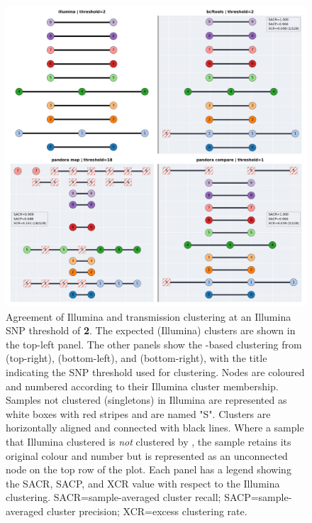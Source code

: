 \begin{figure}
\begin{center}
\includegraphics[width=0.90\columnwidth]{Chapter2/Figs/clustering-t2.png}
\caption{{Agreement of Illumina and \ont{} transmission clustering at an Illumina SNP threshold of \textbf{2}. The expected (Illumina) clusters are shown in the top-left panel. The other panels show the \ont{}-based clustering from \bcftools{} (top-right), \map{} (bottom-left), and \compare{} (bottom-right), with the title indicating the SNP threshold used for clustering. Nodes are coloured and numbered according to their Illumina cluster membership. Samples not clustered (singletons) in Illumina are represented as white boxes with red stripes and are named "S". Clusters are horizontally aligned and connected with black lines. Where a sample that Illumina clustered is \emph{not} clustered by \ont{}, the sample retains its original colour and number but is represented as an unconnected node on the top row of the plot. Each \ont{} panel has a legend showing the SACR, SACP, and XCR value with respect to the Illumina clustering. SACR=sample-averaged cluster recall; SACP=sample-averaged cluster precision; XCR=excess clustering rate.
{\label{fig:clustering-t2}}
}}
\end{center}
\end{figure}

